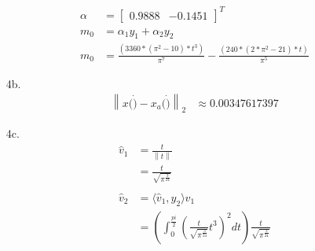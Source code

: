 \documentclass[12pt,fleqn,leqno,letterpaper]{article}
\newcommand{\norm}[1]{\left\lVert#1\right\rVert}
\begin{document}
\begin{enumerate}
\begin{align*}
				\alpha &= \begin{bmatrix} 0.9888 & -0.1451 \end{bmatrix}^{T}\\
				m_{0} &= \alpha_{1} y_{1} + \alpha_{2} y_{2}\\
				m_{0} &= \frac{(3360*(\pi^{2} - 10)*t^{3})}{\pi^{7}} - \frac{(240*(2*\pi^{2} - 21)*t)}{\pi^{5}}
			\end{align*}
		\item[4b.]
			\begin{align*}
				\norm{x(\dot) - x_{a}(\dot)}_{2} &\approx 0.00347617397
			\end{align*}
			\begin{minipage}[t]{\linewidth}
				\raggedright
				\medskip
			\end{minipage}
		\item[4c.]
			\begin{align*}
				\hat{v}_{1} &= \frac{t}{\norm{t}}\\
				            &= \frac{t}{\sqrt{\pi^{\frac{3}{24}}}}\\\\
				\hat{v}_{2} &= \langle \hat{v}_{1}, y_{2} \rangle v_{1}\\
							&= ( \int_{0}^{\frac{pi}{2}} (\frac{t}{\sqrt{\pi^{\frac{3}{24}}}} t^{3})^{2}  dt) \frac{t}{\sqrt{\pi^{\frac{3}{24}}}}\\
			\end{align*}
	\end{enumerate}
\end{document}
